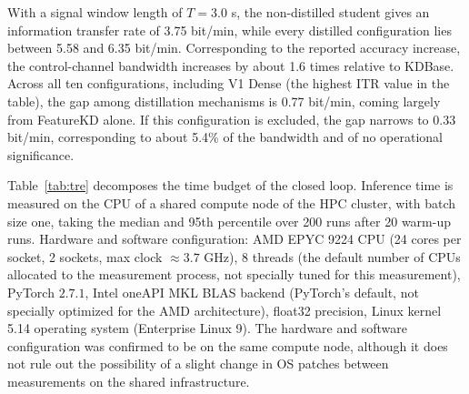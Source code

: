 With a signal window length of $T = 3.0$ s, the non-distilled
student gives an information transfer rate of 3.75 bit/min, while
every distilled configuration lies between 5.58 and 6.35 bit/min.
Corresponding to the reported accuracy increase, the control-channel
bandwidth increases by about 1.6 times relative to KDBase. Across
all ten configurations, including V1 Dense (the highest ITR value in
the table), the gap among distillation mechanisms is 0.77 bit/min,
coming largely from FeatureKD alone. If this configuration is
excluded, the gap narrows to 0.33 bit/min, corresponding to about
5.4\% of the bandwidth and of no operational significance.

Table~\ref{tab:tre} decomposes the time budget of the closed loop.
Inference time is measured on the CPU of a shared compute node of
the HPC cluster, with batch size one, taking the median and 95th
percentile over 200 runs after 20 warm-up runs. Hardware and
software configuration: AMD EPYC 9224 CPU (24 cores per socket, 2
sockets, max clock $\approx 3.7$ GHz), 8 threads (the default
number of CPUs allocated to the measurement process, not specially
tuned for this measurement), PyTorch $2.7.1$, Intel oneAPI MKL BLAS
backend (PyTorch's default, not specially optimized for the AMD
architecture), float32 precision, Linux kernel 5.14 operating system
(Enterprise Linux 9). The hardware and software configuration was
confirmed to be on the same compute node, although it does not rule
out the possibility of a slight change in OS patches between
measurements on the shared infrastructure.


